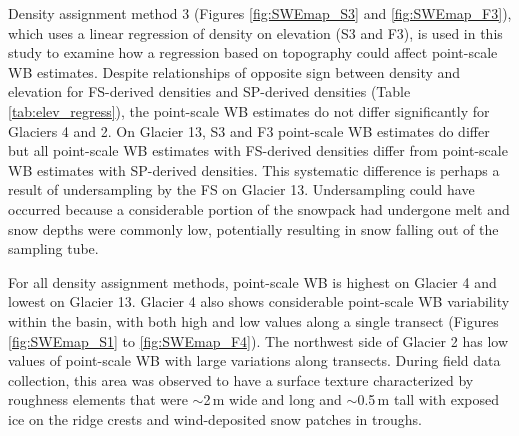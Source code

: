 \documentclass{sfuthesis}
\begin{document}
Density assignment method 3 (Figures \ref{fig:SWEmap_S3} and \ref{fig:SWEmap_F3}), which uses a linear regression of density on elevation (S3 and F3), is used in this study to examine how a regression based on topography could affect point-scale WB estimates. Despite relationships of opposite sign between density and elevation for FS-derived densities and SP-derived densities (Table \ref{tab:elev_regress}), the point-scale WB estimates do not differ significantly for Glaciers 4 and 2. On Glacier 13, S3 and F3 point-scale WB estimates do differ but all point-scale WB estimates with FS-derived densities differ from point-scale WB estimates with SP-derived densities. This systematic difference is perhaps a result of undersampling by the FS on Glacier 13. Undersampling could have occurred because a considerable portion of the snowpack had undergone melt and snow depths were commonly low, potentially resulting in snow falling out of the sampling tube. 

For all density assignment methods, point-scale WB is highest on Glacier 4 and lowest on Glacier 13. Glacier 4 also shows considerable point-scale WB variability within the basin, with both high and low values along a single transect (Figures \ref{fig:SWEmap_S1} to \ref{fig:SWEmap_F4}). The northwest side of Glacier 2 has low values of point-scale WB with large variations along transects. During field data collection, this area was observed to have a surface texture characterized by roughness elements that were $\sim$2\,m wide and long and $\sim$0.5\,m tall with exposed ice on the ridge crests and wind-deposited snow patches in troughs.
\end{document}
